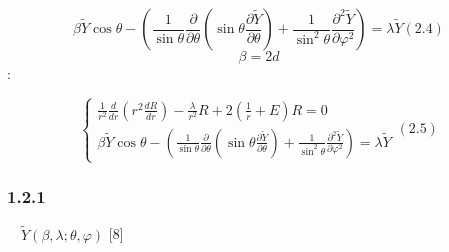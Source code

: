 \documentclass[a4paper]{article}
\begin{document}
\begin{equation*}
\beta \widetilde Y\cos \theta -\left(\frac 1{\sin \theta }\frac{{\partial}}{{\partial}\theta }\left(\sin \theta
\frac{{\partial}\widetilde Y}{{\partial}\theta }\right)+\frac 1{\sin ^2\theta }\frac{{\partial}^2\widetilde
Y}{{\partial}\varphi ^2}\right)=\lambda \widetilde Y(2.4)
\end{equation*}
\begin{equation*}
\beta =2d
\end{equation*}
{\CYRT}{\cyre}{\cyrp}{\cyre}{\cyrr}{\cyrsftsn} {\cyrm}{\cyrery} {\cyrm}{\cyro}{\cyrzh}{\cyre}{\cyrm}
{\cyrr}{\cyra}{\cyrs}{\cyrs}{\cyrm}{\cyra}{\cyrt}{\cyrr}{\cyri}{\cyrv}{\cyra}{\cyrt}{\cyrsftsn}
{\cyro}{\cyrt}{\cyrd}{\cyre}{\cyrl}{\cyrsftsn}{\cyrn}{\cyro}
{\cyru}{\cyrr}{\cyra}{\cyrv}{\cyrn}{\cyre}{\cyrn}{\cyri}{\cyrya} {\cyrn}{\cyra}
{\cyru}{\cyrg}{\cyrl}{\cyro}{\cyrv}{\cyru}{\cyryu} {\cyri}
{\cyrr}{\cyra}{\cyrd}{\cyri}{\cyra}{\cyrl}{\cyrsftsn}{\cyrn}{\cyru}{\cyryu} {\cyrch}{\cyra}{\cyrs}{\cyrt}{\cyrsftsn}:

\begin{equation*}
\left\{\begin{matrix}\frac 1{r^2}\frac d{\mathit{dr}}\left(r^2\frac{dR}{\mathit{dr}}\right)-\frac{\lambda
}{r^2}R+2\left(\frac 1 r+E\right)R=0\\\beta \widetilde Y\cos \theta -\left(\frac 1{\sin \theta
}\frac{{\partial}}{{\partial}\theta }\left(\sin \theta \frac{{\partial}\widetilde Y}{{\partial}\theta }\right)+\frac
1{\sin ^2\theta }\frac{{\partial}^2\widetilde Y}{{\partial}\varphi ^2}\right)=\lambda \widetilde
Y\end{matrix}\right.(2.5)
\end{equation*}
\subsubsection[1.2.1 {\CYRU}{\cyrg}{\cyrl}{\cyro}{\cyrv}{\cyra}{\cyrya} {\cyrch}{\cyra}{\cyrs}{\cyrt}{\cyrsftsn}]{1.2.1
{\CYRU}{\cyrg}{\cyrl}{\cyro}{\cyrv}{\cyra}{\cyrya} {\cyrch}{\cyra}{\cyrs}{\cyrt}{\cyrsftsn}}
\hypertarget{RefHeading4675463868395}{}{\CYRR}{\cyra}{\cyrz}{\cyrl}{\cyro}{\cyrzh}{\cyri}{\cyrm} \ \  $\widetilde
Y(\beta ,\lambda ;\theta ,\varphi )$ {\cyrn}{\cyra}
{\cyrs}{\cyrf}{\cyre}{\cyrr}{\cyri}{\cyrch}{\cyre}{\cyrs}{\cyrk}{\cyri}{\cyre}
{\cyrg}{\cyra}{\cyrr}{\cyrm}{\cyro}{\cyrn}{\cyri}{\cyrk}{\cyri} [8]
\end{document}
